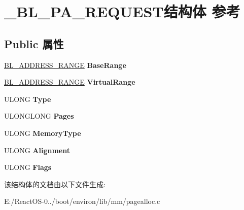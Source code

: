 \hypertarget{struct___b_l___p_a___r_e_q_u_e_s_t}{}\section{\+\_\+\+B\+L\+\_\+\+P\+A\+\_\+\+R\+E\+Q\+U\+E\+S\+T结构体 参考}
\label{struct___b_l___p_a___r_e_q_u_e_s_t}
\subsection*{Public 属性}
\begin{DoxyCompactItemize}
\item 
\mbox{\label{struct___b_l___p_a___r_e_q_u_e_s_t_af00d318601369ff444ede9beacb7a5b5}} 
\hyperlink{struct___b_l___a_d_d_r_e_s_s___r_a_n_g_e}{B\+L\+\_\+\+A\+D\+D\+R\+E\+S\+S\+\_\+\+R\+A\+N\+GE} {\bfseries Base\+Range}
\item 
\mbox{\label{struct___b_l___p_a___r_e_q_u_e_s_t_afe4142797f2521143307eb7390cf773d}} 
\hyperlink{struct___b_l___a_d_d_r_e_s_s___r_a_n_g_e}{B\+L\+\_\+\+A\+D\+D\+R\+E\+S\+S\+\_\+\+R\+A\+N\+GE} {\bfseries Virtual\+Range}
\item 
\mbox{\label{struct___b_l___p_a___r_e_q_u_e_s_t_aa8603301ec72e338eb6a006ead261cf1}} 
U\+L\+O\+NG {\bfseries Type}
\item 
\mbox{\label{struct___b_l___p_a___r_e_q_u_e_s_t_abc281de419ed4dea08a6ceaeb9ccb64f}} 
U\+L\+O\+N\+G\+L\+O\+NG {\bfseries Pages}
\item 
\mbox{\label{struct___b_l___p_a___r_e_q_u_e_s_t_a2315cfd937a5ba0c3cc4137c9042d90b}} 
U\+L\+O\+NG {\bfseries Memory\+Type}
\item 
\mbox{\label{struct___b_l___p_a___r_e_q_u_e_s_t_a085927fdb25cb8717ca749dd2ead1a00}} 
U\+L\+O\+NG {\bfseries Alignment}
\item 
\mbox{\label{struct___b_l___p_a___r_e_q_u_e_s_t_a4cc5c1642897e059912c5a7988fd9bb9}} 
U\+L\+O\+NG {\bfseries Flags}
\end{DoxyCompactItemize}


该结构体的文档由以下文件生成\+:\begin{DoxyCompactItemize}
\item 
E\+:/\+React\+O\+S-\/0../boot/environ/lib/mm/pagealloc.\+c\end{DoxyCompactItemize}
